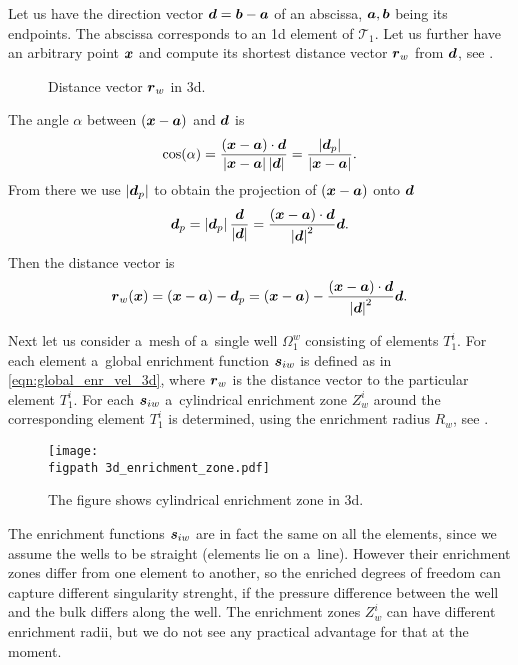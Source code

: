 Let us have the direction vector $\mathbf{\boldsymbol{d}} = \mathbf{\boldsymbol{b}} - \mathbf{\boldsymbol{a}}$ of an abscissa, $\mathbf{\boldsymbol{a}}, \mathbf{\boldsymbol{b}}$ being its endpoints. 
The abscissa corresponds to an 1d element of $\mathcal{T}_1$.
Let us further have an arbitrary point $\mathbf{\boldsymbol{x}}$ and compute its 
shortest distance vector $\mathbf{\boldsymbol{r}}_w$ from $\mathbf{\boldsymbol{d}}$, see .
%
\begin{figure}[!htb]
  \vspace{5pt}
  \centering
  \def\svgwidth{0.5\textwidth}
  
  \caption{Distance vector $\mathbf{\boldsymbol{r}}_w$ in 3d.}
  \label{fig:distance_vector_3d}
\end{figure}
%
The angle $\alpha$ between $(\mathbf{\boldsymbol{x}} - \mathbf{\boldsymbol{a}})$ and $\mathbf{\boldsymbol{d}}$ is 
\[
\cos(\alpha) = \frac{(\mathbf{\boldsymbol{x}} - \mathbf{\boldsymbol{a}})\cdot\mathbf{\boldsymbol{d}}}{\left|\mathbf{\boldsymbol{x}} - \mathbf{\boldsymbol{a}}\right|\left|\mathbf{\boldsymbol{d}}\right|} = \frac{\left|\mathbf{\boldsymbol{d}}_p\right|}{\left|\mathbf{\boldsymbol{x}} - \mathbf{\boldsymbol{a}}\right|}.
\]
From there we use $\left|\mathbf{\boldsymbol{d}}_p\right|$ to obtain the projection of $(\mathbf{\boldsymbol{x}}-\mathbf{\boldsymbol{a}})$ onto $\mathbf{\boldsymbol{d}}$
\[
\mathbf{\boldsymbol{d}}_p = \left|\mathbf{\boldsymbol{d}}_p\right|\frac{\mathbf{\boldsymbol{d}}}{\left|\mathbf{\boldsymbol{d}}\right|} = \frac{(\mathbf{\boldsymbol{x}} - \mathbf{\boldsymbol{a}})\cdot\mathbf{\boldsymbol{d}}}{\left|\mathbf{\boldsymbol{d}}\right|^2} \mathbf{\boldsymbol{d}}.
\]
Then the distance vector is
\begin{equation}
  \mathbf{\boldsymbol{r}}_w(\mathbf{\boldsymbol{x}}) = (\mathbf{\boldsymbol{x}} - \mathbf{\boldsymbol{a}}) - \mathbf{\boldsymbol{d}}_p = (\mathbf{\boldsymbol{x}} - \mathbf{\boldsymbol{a}}) - \frac{(\mathbf{\boldsymbol{x}} - \mathbf{\boldsymbol{a}})\cdot\mathbf{\boldsymbol{d}}}{\left|\mathbf{\boldsymbol{d}}\right|^2} \mathbf{\boldsymbol{d}}.
\end{equation}

Next let us consider a~mesh of a~single well $\Omega^w_1$ consisting of elements $T^i_1$.
For each element a~global enrichment function $\mathbf{\boldsymbol{s}}_{iw}$ is defined as in \eqref{eqn:global_enr_vel_3d},
where $\mathbf{\boldsymbol{r}}_w$ is the distance vector to the particular element $T^i_1$.
For each $\mathbf{\boldsymbol{s}}_{iw}$ a~cylindrical enrichment zone $Z^i_w$ around the corresponding element $T^i_1$ is determined, 
using the enrichment radius $R_w$, see .
%
\begin{figure}[!htb]
    \centering    
    \texttt{[image: \\figpath 3d\_enrichment\_zone.pdf]} 
    \caption[enrichment zone in 3d]
  {The figure shows cylindrical enrichment zone in 3d.}
  \label{fig:enrichment_zone_in_3d}
\end{figure}
%
The enrichment functions $\mathbf{\boldsymbol{s}}_{iw}$ are in fact the same on all the elements,
since we assume the wells to be straight (elements lie on a~line). However their enrichment zones differ from one element to another,
so the enriched degrees of freedom can capture different singularity strenght, if the pressure difference between
the well and the bulk differs along the well.
The enrichment zones $Z^i_w$ can have different enrichment radii, but we do not see any practical advantage for that at the moment.

